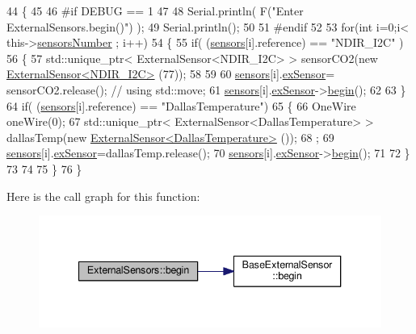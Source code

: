 \begin{DoxyCode}
44 \{
45 
46 \textcolor{preprocessor}{#if DEBUG == 1}
47 
48     Serial.println( F(\textcolor{stringliteral}{"Enter ExternalSensors.begin()"}) );
49     Serial.println();
50 
51 \textcolor{preprocessor}{#endif }
52 
53     \textcolor{keywordflow}{for}(\textcolor{keywordtype}{int} i=0;i< this->\hyperlink{classExternalSensors_a58e4fbf9adeae787d92be5fa33043b5d}{sensorsNumber} ; i++)
54     \{
55         \textcolor{keywordflow}{if}( (\hyperlink{classExternalSensors_a284233f884fcf00154a44740cf1d9e1e}{sensors}[i].reference) == \textcolor{stringliteral}{"NDIR\_I2C"} )
56         \{   
57             std::unique\_ptr< ExternalSensor<NDIR\_I2C> > sensorCO2(\textcolor{keyword}{new} 
      \hyperlink{classExternalSensor_3_01NDIR__I2C_01_4}{ExternalSensor<NDIR\_I2C>} (77));
58 
59 
60             \hyperlink{classExternalSensors_a284233f884fcf00154a44740cf1d9e1e}{sensors}[i].\hyperlink{structExternalSensors_1_1sensor_a9bca150fd468b8d0e090e6d72c5c2b48}{exSensor}= sensorCO2.release();                       \textcolor{comment}{// using
       std::move;}
61             \hyperlink{classExternalSensors_a284233f884fcf00154a44740cf1d9e1e}{sensors}[i].\hyperlink{structExternalSensors_1_1sensor_a9bca150fd468b8d0e090e6d72c5c2b48}{exSensor}->\hyperlink{classBaseExternalSensor_a87d132803d4f4fdd4e66332809f0c9a0}{begin}();
62 
63         \}
64         \textcolor{keywordflow}{if}( (\hyperlink{classExternalSensors_a284233f884fcf00154a44740cf1d9e1e}{sensors}[i].reference) == \textcolor{stringliteral}{"DallasTemperature"})
65         \{
66             OneWire oneWire(0);
67             std::unique\_ptr< ExternalSensor<DallasTemperature> > dallasTemp(\textcolor{keyword}{new} 
      \hyperlink{classExternalSensor_3_01DallasTemperature_01_4}{ExternalSensor<DallasTemperature>} ());
68              ;
69             \hyperlink{classExternalSensors_a284233f884fcf00154a44740cf1d9e1e}{sensors}[i].\hyperlink{structExternalSensors_1_1sensor_a9bca150fd468b8d0e090e6d72c5c2b48}{exSensor}=dallasTemp.release();
70             \hyperlink{classExternalSensors_a284233f884fcf00154a44740cf1d9e1e}{sensors}[i].\hyperlink{structExternalSensors_1_1sensor_a9bca150fd468b8d0e090e6d72c5c2b48}{exSensor}->\hyperlink{classBaseExternalSensor_a87d132803d4f4fdd4e66332809f0c9a0}{begin}();
71             
72         \}
73         
74         
75     \}
76 \}
\end{DoxyCode}
Here is the call graph for this function\+:
\nopagebreak
\begin{figure}[H]
\begin{center}
\leavevmode
\includegraphics[width=340pt]{classExternalSensors_a58ede0d786a86417254708870f04a21e_cgraph}
\end{center}
\end{figure}
